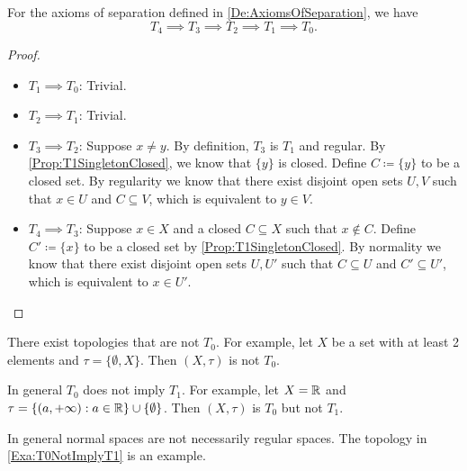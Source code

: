 \documentclass[screen]{techreport}
\numberwithin{equation}{section}
\begin{document}
\begin{theorem}\label{The:HierarchyOfSeparation}
	For the axioms of separation defined in \cref{De:AxiomsOfSeparation}, we have
	\begin{equation*}
		T_4 \implies T_3 \implies T_2 \implies T_1 \implies T_0.
	\end{equation*}
\end{theorem}
\begin{proof}\
	\begin{itemize}
		\item $T_1 \implies T_0$: Trivial.
		\item $T_2 \implies T_1$: Trivial.
		\item $T_3 \implies T_2$: Suppose $x \neq y$. By definition, $T_3$ is $T_1$ and regular.
		By \cref{Prop:T1SingletonClosed}, we know that $\{y\}$ is closed.
		Define $C \coloneqq \{ y\}$ to be a closed set.
		By regularity we know that there exist disjoint open sets $U,V$ such that $x \in U$ and $C \subseteq V$, which is equivalent to $y \in V$.
		\item $T_4 \implies T_3$: Suppose $x \in X$ and a closed $C \subseteq X$ such that $x \not\in C$.
		Define $C' \coloneqq \{ x\}$ to be a closed set by \cref{Prop:T1SingletonClosed}.
		By normality we know that there exist disjoint open sets $U,U'$ such that $C \subseteq U$ and $C' \subseteq U'$, which is equivalent to $x \in U'$.
	\end{itemize}
\end{proof}

\begin{example}\label{Exa:NotT0}
	There exist topologies that are not $T_0$.
	For example, let $X$ be a set with at least 2 elements and $\tau = \{ \emptyset, X\}$.
	Then $(X,\tau)$ is not $T_0$.
\end{example}

\begin{example}\label{Exa:T0NotImplyT1}
	In general $T_0$ does not imply $T_1$.
	For example, let $X = \mathbb{R}$ and $\tau = \{ (a, +\infty) : a \in \mathbb{R} \} \cup \{ \emptyset \}$.
	Then $(X,\tau)$ is $T_0$ but not $T_1$.
\end{example}

\begin{example}\label{Exa:NormalNotImplyRegular}
	In general normal spaces are not necessarily regular spaces.
	The topology in \cref{Exa:T0NotImplyT1} is an example.
\end{example}
\end{document}
